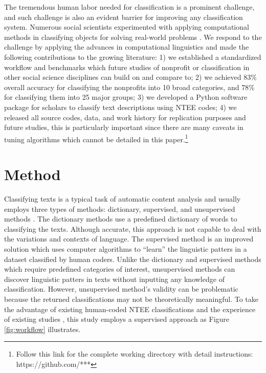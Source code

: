 \documentclass[11pt]{article}
\begin{document}
The tremendous human labor needed for classification is a prominent challenge, and such challenge is also an evident barrier for improving any classification system. Numerous social scientists experimented with applying computational methods in classifying objects for solving real-world problems \parencite[e.g.,][]{BacakPrincipledMachineLearning2018,NelsonFutureCodingComparison2018,FyallNTEECodesOpportunities2018,GrimmerTextDataPromise2013}. We respond to the challenge by applying the advances in computational linguistics and made the following contributions to the growing literature: 1) we established a standardized workflow and benchmarks which future studies of nonprofit or classification in other social science disciplines can build on and compare to; 2) we achieved {83\%} overall accuracy for classifying the nonprofits into 10 broad categories, and {78\%} for classifying them into 25 major groups; 3) we developed a Python software package for scholars to classify text descriptions using NTEE codes; 4) we released all source codes, data, and work history for replication purposes and future studies, this is particularly important since there are many caveats in tuning algorithms which cannot be detailed in this paper.\footnote{Follow this link for the complete working directory with detail instructions: https://github.com/***}


\section{Method}

Classifying texts is a typical task of automatic content analysis and usually employs three types of methods: dictionary, supervised, and unsupervised methods \parencite[268-269]{GrimmerTextDataPromise2013}. The dictionary methods use a predefined dictionary of words to classifying the texts. Although accurate, this approach is not capable to deal with the variations and contexts of language. The supervised method is an improved solution which uses computer algorithms to ``learn'' the linguistic patters in a dataset classified by human coders. Unlike the dictionary and supervised methods which require predefined categories of interest, unsupervised methods can discover linguistic patters in texts without inputting any knowledge of classification. However, unsupervised method's validity can be problematic because the returned classifications may not be theoretically meaningful. To take the advantage of existing human-coded NTEE classifications and the experience of existing studies \parencite{NelsonFutureCodingComparison2018,FyallNTEECodesOpportunities2018}, this study employs a supervised approach as Figure \ref{fig:workflow} illustrates.
\end{document}
